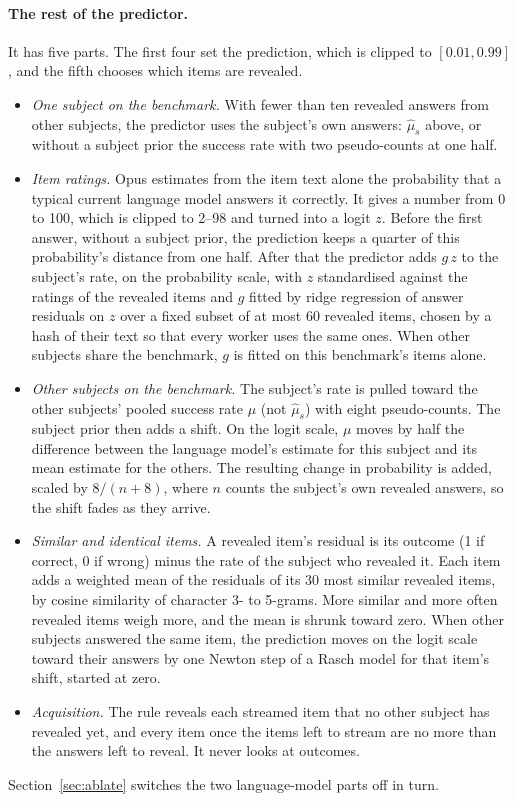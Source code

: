 \documentclass{article}
\begin{document}
\paragraph{The rest of the predictor.} It has five parts. The first four set the prediction, which is clipped to $[0.01, 0.99]$, and the fifth chooses which items are revealed.
\begin{itemize}[leftmargin=*,itemsep=0pt,topsep=2pt]
\item \emph{One subject on the benchmark.} With fewer than ten revealed answers from other subjects, the predictor uses the subject's own answers: $\hat\mu_s$ above, or without a subject prior the success rate with two pseudo-counts at one half.
\item \emph{Item ratings.} Opus estimates from the item text alone the probability that a typical current language model answers it correctly. It gives a number from 0 to 100, which is clipped to 2--98 and turned into a logit $z$. Before the first answer, without a subject prior, the prediction keeps a quarter of this probability's distance from one half. After that the predictor adds $g\,z$ to the subject's rate, on the probability scale, with $z$ standardised against the ratings of the revealed items and $g$ fitted by ridge regression of answer residuals on $z$ over a fixed subset of at most 60 revealed items, chosen by a hash of their text so that every worker uses the same ones. When other subjects share the benchmark, $g$ is fitted on this benchmark's items alone.
\item \emph{Other subjects on the benchmark.} The subject's rate is pulled toward the other subjects' pooled success rate $\mu$ (not $\hat\mu_s$) with eight pseudo-counts. The subject prior then adds a shift. On the logit scale, $\mu$ moves by half the difference between the language model's estimate for this subject and its mean estimate for the others. The resulting change in probability is added, scaled by $8/(n+8)$, where $n$ counts the subject's own revealed answers, so the shift fades as they arrive.
\item \emph{Similar and identical items.} A revealed item's residual is its outcome (1 if correct, 0 if wrong) minus the rate of the subject who revealed it. Each item adds a weighted mean of the residuals of its 30 most similar revealed items, by cosine similarity of character 3- to 5-grams. More similar and more often revealed items weigh more, and the mean is shrunk toward zero. When other subjects answered the same item, the prediction moves on the logit scale toward their answers by one Newton step of a Rasch model for that item's shift, started at zero.
\item \emph{Acquisition.} The rule reveals each streamed item that no other subject has revealed yet, and every item once the items left to stream are no more than the answers left to reveal. It never looks at outcomes.
\end{itemize}
Section~\ref{sec:ablate} switches the two language-model parts off in turn.
\end{document}
